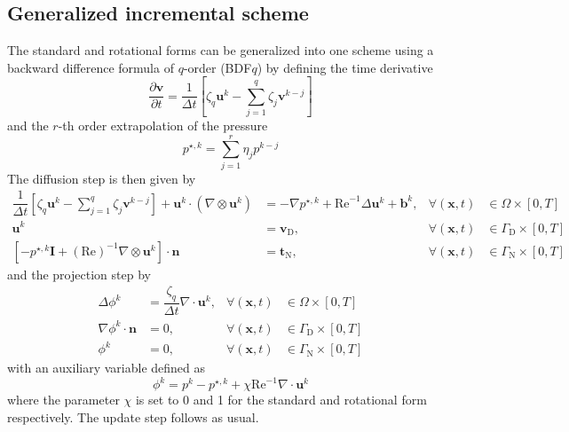 \documentclass[]{scrartcl}
\newcommand{\pfrac}[2]{\frac{\partial #1}{\partial #2}}
\newcommand{\bs}[1]{\boldsymbol{#1}}
\begin{document}
\subsection{Generalized incremental scheme}
The standard and rotational forms can be generalized into one scheme using a backward difference formula of $q$-order (BDF$q$) by defining the time derivative
\begin{equation*}
	\pfrac{\bs{v}}{t} = \dfrac{1}{\Delta t}\left[ \zeta_q \bs{u}^{k} - \sum_{j=1}^{q} \zeta_j \bs{v}^{k-j}\right]
\end{equation*}
and the $r$-th order extrapolation of the pressure 
\begin{equation*}
	p^{\star, k} = \sum_{j=1}^{r} \eta_j p^{k-j}
\end{equation*}
The diffusion step is then given by
\begin{equation*}
	\begin{aligned}
		\dfrac{1}{\Delta t} \left[\zeta_q \bs{u}^{k} - \sum_{j=1}^{q} \zeta_j \bs{v}^{k-j}\right]  + \bs{u}^{k} \cdot (\nabla \otimes \bs{u}^{k}) &= -\nabla	p^{\star, k} +  \mathrm{Re}^{-1} \Delta \bs{u}^{k} + \bs{b}^{k}, &\forall (\bs{x}, t) &\in \Omega \times \left[0, T \right]  \\
		\bs{u}^{k} &= \bs{v}_\textrm{D}, &\forall (\bs{x}, t) &\in \Gamma_\textrm{D} \times \left[0, T \right] \\
		[-	p^{\star, k} \bs{I} + (\textrm{Re})^{-1}\nabla \otimes \bs{u}^{k}]\cdot \bs{n} &= \bs{t}_\textrm{N}, &\forall \left(\bs{x}, t\right) &\in \Gamma_\textrm{N} \times \left[0, T \right]
	\end{aligned}
\end{equation*}
and the projection step by
\begin{equation*}
	\begin{aligned}
		\Delta \phi^{k} &= \dfrac{\zeta_q}{\Delta t} \nabla \cdot \bs{u}^{k},  &\forall (\bs{x}, t) &\in \Omega \times \left[0, T \right] \\
		\nabla \phi^{k} \cdot \bs{n} &= 0, &\forall (\bs{x}, t) &\in \Gamma_\textrm{D} \times \left[0, T \right] \\
		\phi^{k} &= 0, &\forall\left(\bs{x}, t\right) &\in \Gamma_\textrm{N} \times \left[0, T \right]
	\end{aligned}
\end{equation*}
with an auxiliary variable defined as
\begin{equation*}
	\phi^{k} = p^{k} - p^{\star, k} + \chi\textrm{Re}^{-1} \nabla \cdot \bs{u}^{k}
\end{equation*}
where the parameter $\chi$ is set to 0 and 1 for the standard and rotational form respectively. The update step follows as usual.
\end{document}
